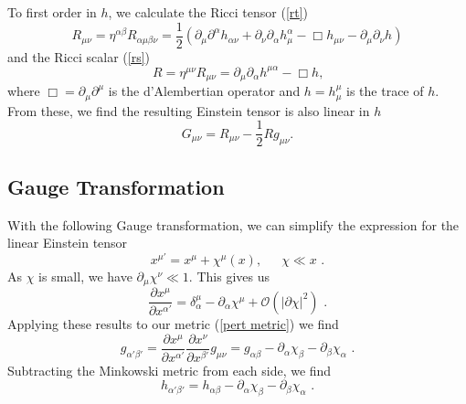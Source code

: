 \documentclass[11pt]{cuthesis}
\newcommand{\mn}{_{\mu\nu}}
\newcommand{\fs}{\text{ .}}
\newcommand{\pd}{\partial}
\begin{document}
To first order in $h$, we calculate the Ricci tensor (\ref{rt})
\begin{equation} \label{lin rt}
R\mn =\eta^{\alpha \beta}R_{\alpha \mu \beta \nu} = \frac{1}{2}\left( \pd_\mu \pd ^\alpha h_{\alpha \nu} + \pd_\nu \pd_\alpha h^\alpha_\mu -\Box h\mn -\pd_\mu \pd_\nu h \right)
\end{equation}
and the Ricci scalar (\ref{rs}) 
\begin{equation} \label{lin rs}
R=\eta^{\mu \nu}R\mn=\pd _\mu \pd_ \alpha h^{\mu \alpha} - \Box h \textbf{,}
\end{equation}
where $\Box=\pd_\mu \pd^\mu $ is the d'Alembertian operator and $h=h^\mu_\mu$ is the trace of $h$. From these, we find the resulting Einstein tensor is also linear in $h$ 
\begin{equation} \label{lin Einstein}
G\mn =R\mn -\frac{1}{2} R g\mn \textbf{.}
\end{equation}

\subsection{Gauge Transformation}
With the following Gauge transformation, we can simplify the expression for the linear Einstein tensor
\begin{equation}
x^{\mu'}=x^\mu +\chi ^\mu (x)\text{,} \hspace{20pt}\chi \ll x\fs
\end{equation} 
As $\chi$ is small, we have $\partial_\mu \chi^\nu \ll 1$. This gives us
\begin{equation}
\frac{\pd x^\mu}{\pd x^{\alpha'}}=\delta^\mu_\alpha-\pd_\alpha\chi^\mu +\mathcal{O}(|\pd \chi|^2) \fs
\end{equation}  
Applying these results to our metric (\ref{pert metric}) we find
\begin{equation} 
g_{\alpha' \beta'}=\frac{\pd x^\mu}{\pd x^{\alpha'}}\frac{\pd x^\nu}{\pd x^{\beta'}}g\mn=g_{\alpha \beta}-\pd_\alpha \chi_\beta -\pd_\beta \chi_\alpha \fs
\end{equation}
Subtracting the Minkowski metric from each side, we find 
\begin{equation} \label{pert transf}
h_{\alpha' \beta'}=h_{\alpha \beta}-\pd_\alpha\chi_\beta-\pd_\beta\chi_\alpha \fs
\end{equation}
\end{document}
